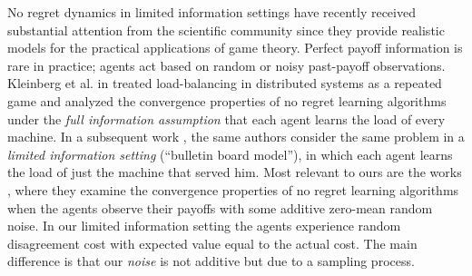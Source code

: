 No regret dynamics in limited information settings have recently received
substantial attention from the scientific community since they provide
realistic models for the practical applications of game theory.  Perfect payoff
information is rare in practice; agents act based on random or noisy past-payoff 
observations.  Kleinberg et al. in \cite{KPT09} treated load-balancing
in distributed systems as a repeated game and analyzed the convergence
properties of no regret learning algorithms under the \emph{full information
  assumption} that each agent learns the load of every machine.  In a
subsequent work \cite{KPT11}, the same authors consider the same problem in a
\emph{limited information setting} (\enquote{bulletin board model}), in which
each agent learns the load of just the machine that served him. Most relevant
to ours are the works \cite{HCM17,MS17,BM17,CHM17}, where they examine the
convergence properties of no regret learning algorithms when the agents observe
their payoffs with some additive zero-mean random noise. In our limited
information setting the agents experience random disagreement cost with
expected value equal to the actual cost.  The main difference is that our
\emph{noise} is not additive but due to a sampling process.
